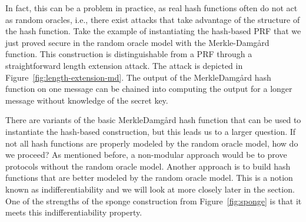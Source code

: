 In fact, this can be a problem in practice, as real hash functions often do not act as random oracles, i.e., there exist attacks that take advantage of the structure of the hash function.
Take the example of instantiating the hash-based PRF that we just proved secure in the random oracle model with the Merkle-Damg\aa rd function.
This construction is distinguishable from a PRF through a straightforward length extension attack.
The attack is depicted in Figure~\ref{fig:length-extension-md}.
The output of the Merkle\dash Damg\aa rd hash function on one message can be chained into computing the output for a longer message without knowledge of the secret key.

There are variants of the basic Merkle\dash Damg\aa rd hash function that can be used to instantiate the hash-based construction, but this leads us to a larger question.
If not all hash functions are properly modeled by the random oracle model, how do we proceed?
As mentioned before, a non-modular approach would be to prove protocols without the random oracle model.
Another approach is to build hash functions that are better modeled by the random oracle model.
This is a notion known as indifferentiability and we will look at more closely later in the section.
One of the strengths of the sponge construction from Figure~\ref{fig:sponge} is that it meets this indifferentiability property.
